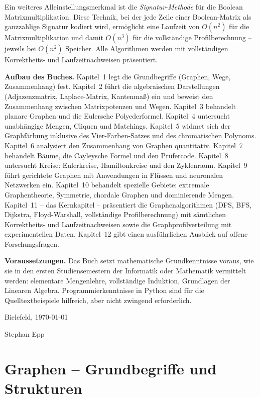 ﻿\documentclass[a4paper,12pt,openany,oneside]{book}
\theoremstyle{definition}
\theoremstyle{plain}
\theoremstyle{remark}
\begin{document}
Ein weiteres Alleinstellungsmerkmal ist die \emph{Signatur-Methode} f\"ur
die Boolean Matrixmultiplikation. Diese Technik, bei der jede Zeile einer
Boolean-Matrix als ganzzahlige Signatur kodiert wird, erm\"oglicht eine
Laufzeit von $O(n^2)$ f\"ur die Matrixmultiplikation und damit $O(n^3)$
f\"ur die vollst\"andige Profilberechnung -- jeweils bei $O(n^2)$ Speicher.
Alle Algorithmen werden mit vollst\"andigen Korrektheits- und
Laufzeitnachweisen pr\"asentiert.

\medskip
\noindent\textbf{Aufbau des Buches.}
Kapitel~1 legt die Grundbegriffe (Graphen, Wege, Zusammenhang) fest.
Kapitel~2 f\"uhrt die algebraischen Darstellungen (Adjazenzmatrix,
Laplace-Matrix, Kantenma\ss{}) ein und beweist den Zusammenhang zwischen
Matrixpotenzen und Wegen.
Kapitel~3 behandelt planare Graphen und die Eulersche Polyederformel.
Kapitel~4 untersucht unabh\"angige Mengen, Cliquen und Matchings.
Kapitel~5 widmet sich der Graphf\"arbung inklusive des Vier-Farben-Satzes
und des chromatischen Polynoms.
Kapitel~6 analysiert den Zusammenhang von Graphen quantitativ.
Kapitel~7 behandelt B\"aume, die Cayleysche Formel und den Pr\"ufercode.
Kapitel~8 untersucht Kreise: Eulerkreise, Hamiltonkreise und den Zyklenraum.
Kapitel~9 f\"uhrt gerichtete Graphen mit Anwendungen in Fl\"ussen und
neuronalen Netzwerken ein.
Kapitel~10 behandelt spezielle Gebiete: extremale Graphentheorie,
Symmetrie, chordale Graphen und dominierende Mengen.
Kapitel~11 -- das Kernkapitel -- pr\"asentiert die Graphenalgorithmen
(DFS, BFS, Dijkstra, Floyd-Warshall, vollst\"andige Profilberechnung) mit
s\"amtlichen Korrektheits- und Laufzeitnachweisen sowie die
Graphprofilverteilung mit experimentellen Daten.
Kapitel~12 gibt einen ausf\"uhrlichen Ausblick auf offene Forschungsfragen.

\medskip
\noindent\textbf{Voraussetzungen.}
Das Buch setzt mathematische Grundkenntnisse voraus, wie sie in den
ersten Studiensemestern der Informatik oder Mathematik vermittelt werden:
elementare Mengenlehre, vollst\"andige Induktion, Grundlagen der
Linearen Algebra. Programmierkenntnisse in Python sind f\"ur die
Quelltextbeispiele hilfreich, aber nicht zwingend erforderlich.

\bigskip
\noindent Bielefeld, \today

\hfill Stephan Epp

\mainmatter
\chapter{Graphen -- Grundbegriffe und Strukturen}
\end{document}
